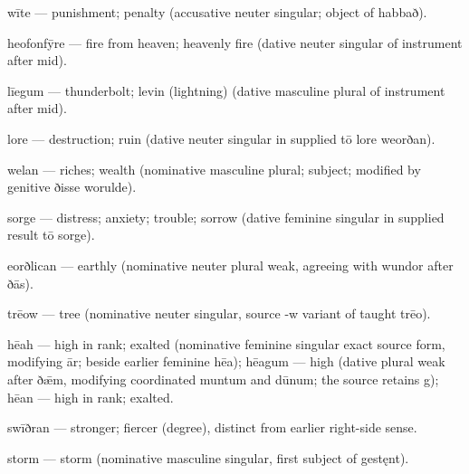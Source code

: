 wīte — punishment; penalty (accusative neuter singular; object of habbað).

heofonfȳre — fire from heaven; heavenly fire (dative neuter singular of instrument after mid).

līegum — thunderbolt; levin (lightning) (dative masculine plural of instrument after mid).

lore — destruction; ruin (dative neuter singular in supplied tō lore weorðan).

welan — riches; wealth (nominative masculine plural; subject; modified by genitive ðisse worulde).

sorge — distress; anxiety; trouble; sorrow (dative feminine singular in supplied result tō sorge).

eorðlican — earthly (nominative neuter plural weak, agreeing with wundor after ðās).

trēow — tree (nominative neuter singular, source -w variant of taught trēo).

hēah — high in rank; exalted (nominative feminine singular exact source form, modifying ār; beside earlier feminine hēa); hēagum — high (dative plural weak after ðǣm, modifying coordinated muntum and dūnum; the source retains g); hēan — high in rank; exalted.

swīðran — stronger; fiercer (degree), distinct from earlier right-side sense.

storm — storm (nominative masculine singular, first subject of gestęnt).


